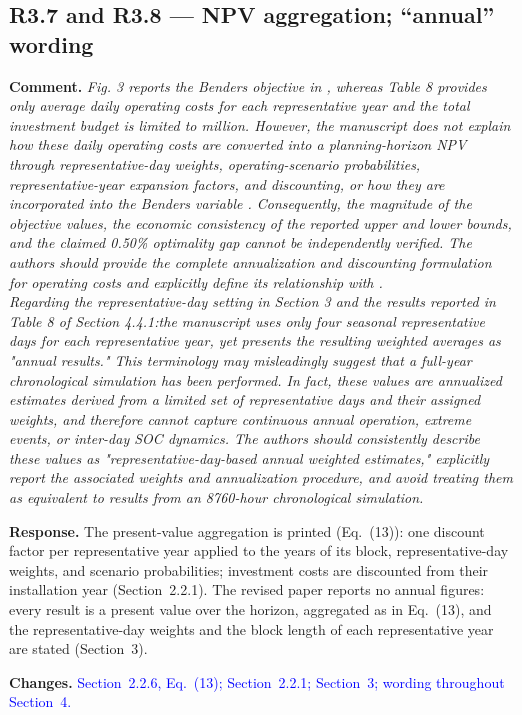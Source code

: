 \documentclass[11pt]{article}
\newcommand{\rcomment}[1]{\par\medskip\noindent\textbf{Comment.} \textit{#1}\par\smallskip}
\newcommand{\rresponse}[1]{\noindent\textbf{Response.} #1\par\smallskip}
\newcommand{\rchanges}[1]{\noindent\textbf{Changes.} \textcolor{blue}{#1}\par\medskip}
\begin{document}
\subsection*{R3.7 and R3.8 --- NPV aggregation; ``annual'' wording}
\rcomment{
Fig. 3 reports the Benders objective in , whereas Table 8 provides only average daily operating costs for each representative year and the total investment budget is limited to million. However, the manuscript does not explain how these daily operating costs are converted into a planning-horizon NPV through representative-day weights, operating-scenario probabilities, representative-year expansion factors, and discounting, or how they are incorporated into the Benders variable . Consequently, the magnitude of the objective values, the economic consistency of the reported upper and lower bounds, and the claimed 0.50\% optimality gap cannot be independently verified. The authors should provide the complete annualization and discounting formulation for operating costs and explicitly define its relationship with .\\
Regarding the representative-day setting in Section 3 and the results reported in Table 8 of Section 4.4.1:the manuscript uses only four seasonal representative days for each representative year, yet presents the resulting weighted averages as "annual results." This terminology may misleadingly suggest that a full-year chronological simulation has been performed. In fact, these values are annualized estimates derived from a limited set of representative days and their assigned weights, and therefore cannot capture continuous annual operation, extreme events, or inter-day SOC dynamics. The authors should consistently describe these values as "representative-day-based annual weighted estimates," explicitly report the associated weights and annualization procedure, and avoid treating them as equivalent to results from an 8760-hour chronological simulation.
}
\rresponse{The present-value aggregation is printed (Eq.~(13)): one discount factor per representative year applied to
the years of its block, representative-day weights, and scenario probabilities; investment costs are
discounted from their installation year (Section~2.2.1). The revised paper reports no annual figures: every result is a present value over the horizon, aggregated as in Eq.~(13), and the representative-day weights and the block length of each representative year are stated (Section~3).}
\rchanges{Section~2.2.6, Eq.~(13); Section~2.2.1; Section~3; wording throughout Section~4.}
\end{document}
